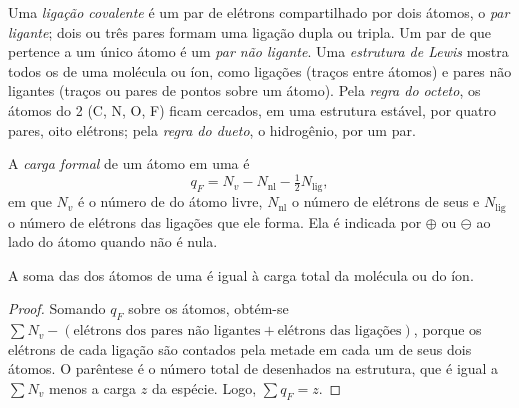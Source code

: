 \begin{definition}\label{def:b1:lewis-resonance-vsepr:lewis}
Uma \emph{ligação covalente} é um par de elétrons
compartilhado por dois átomos, o \emph{par ligante}; dois ou
três pares formam uma ligação dupla ou tripla. Um par de  que pertence a um único átomo é um \emph{par não
ligante}. Uma
\emph{estrutura de Lewis} mostra todos os
 de uma molécula ou íon, como ligações (traços entre
átomos) e pares não ligantes (traços ou pares de pontos sobre um átomo).
Pela \emph{regra do
octeto}, os átomos do  2 (C, N, O, F) ficam
cercados, em uma estrutura estável, por quatro pares, oito elétrons; pela
\emph{regra do dueto}, o hidrogênio, por um par.
\end{definition}

\begin{definition}\label{def:b1:lewis-resonance-vsepr:formal-charge}
A \emph{carga formal} de um átomo em uma  é
\[
  q_F = N_v - N_{\text{nl}} - \tfrac12 N_{\text{lig}},
\]
em que $N_v$ é o número de  do átomo livre,
$N_{\text{nl}}$ o número de elétrons de seus  e
$N_{\text{lig}}$ o número de elétrons das ligações que ele forma. Ela é
indicada por $\oplus$ ou $\ominus$ ao lado do átomo quando não é nula.
\end{definition}

\begin{proposition}\label{prop:b1:lewis-resonance-vsepr:formal-sum}
A soma das  dos átomos de uma  é igual
à carga total da molécula ou do íon.
\end{proposition}

\begin{proof}
Somando $q_F$ sobre os átomos, obtém-se $\sum N_v - (\text{elétrons dos pares
não ligantes} + \text{elétrons das ligações})$, porque os elétrons de cada
ligação são contados pela metade em cada um de seus dois átomos. O
parêntese é o número total de  desenhados na
estrutura, que é igual a $\sum N_v$ menos a carga $z$ da espécie. Logo,
$\sum q_F = z$.
\end{proof}

